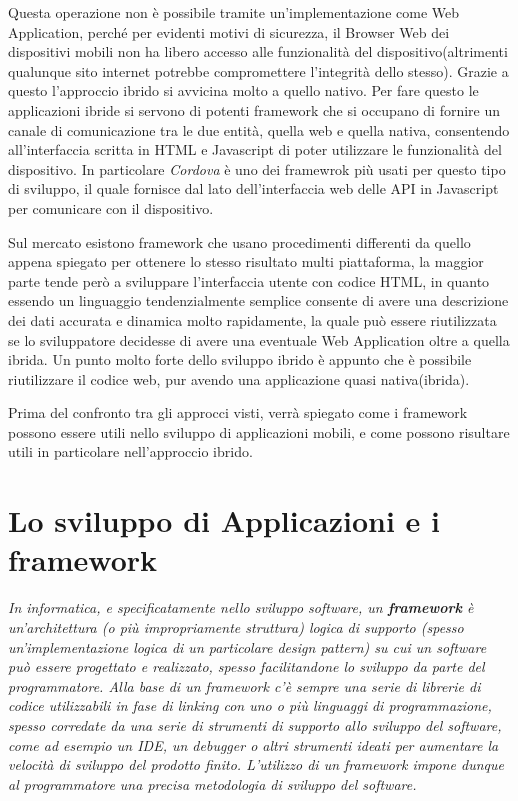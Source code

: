 Questa operazione non è possibile tramite un'implementazione come Web Application, perché per evidenti motivi di sicurezza, il Browser Web dei dispositivi mobili non ha libero accesso alle funzionalità del dispositivo(altrimenti qualunque sito internet potrebbe compromettere l'integrità dello stesso). Grazie a questo l'approccio ibrido si avvicina molto a quello nativo. Per fare questo le applicazioni ibride si servono di potenti framework che si occupano di fornire un canale di comunicazione tra le due entità, quella web e quella nativa, consentendo all'interfaccia scritta in HTML e Javascript di poter utilizzare le funzionalità del dispositivo. In particolare \emph{Cordova} è uno dei framewrok più usati per questo tipo di sviluppo, il quale fornisce dal lato dell'interfaccia web delle API in Javascript per comunicare con il dispositivo.

Sul mercato esistono framework che usano procedimenti differenti da quello appena spiegato per ottenere lo stesso risultato multi piattaforma, la maggior parte tende però a sviluppare l'interfaccia utente con codice
HTML, in quanto essendo un linguaggio tendenzialmente semplice consente di avere una descrizione dei dati accurata e dinamica molto rapidamente, la quale può essere riutilizzata se lo sviluppatore decidesse di avere una eventuale Web Application oltre a quella ibrida. Un punto molto forte dello sviluppo ibrido è appunto che è possibile riutilizzare il codice web, pur avendo una applicazione quasi nativa(ibrida).  

Prima del confronto tra gli approcci visti, verrà spiegato come i framework possono essere utili nello sviluppo di applicazioni mobili, e come possono risultare utili in particolare nell'approccio ibrido.

\section{Lo sviluppo di Applicazioni e i framework}
\label{sec:appAndFramework}
\textit{In informatica, e specificatamente nello sviluppo software, un \textbf{framework} è un'architettura (o più impropriamente struttura) logica di supporto (spesso un'implementazione logica di un particolare design pattern) su cui un software può essere progettato e realizzato, spesso facilitandone lo sviluppo da parte del programmatore. Alla base di un framework c'è sempre una serie di librerie di codice utilizzabili in fase di linking con uno o più linguaggi di programmazione, spesso corredate da una serie di strumenti di supporto allo sviluppo del software, come ad esempio un IDE, un debugger o altri strumenti ideati per aumentare la velocità di sviluppo del prodotto finito. L'utilizzo di un framework impone dunque al programmatore una precisa metodologia di sviluppo del software.}\\
\hspace*{\fill}\cite{wiki:framework}

